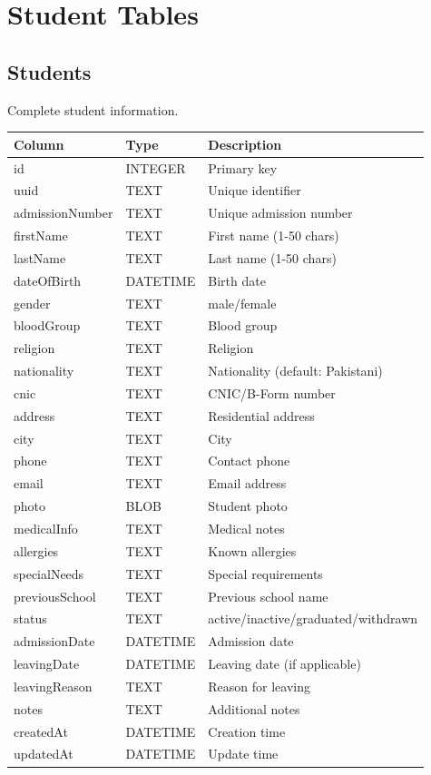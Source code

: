 \documentclass[12pt,a4paper]{report}
\begin{document}
\chapter{Student Tables}

\section{Students}

Complete student information.

\begin{longtable}{@{}p{4cm}p{2.5cm}p{6.5cm}@{}}
\toprule
\textbf{Column} & \textbf{Type} & \textbf{Description} \\
\midrule
\endhead
id & INTEGER & Primary key \\
uuid & TEXT & Unique identifier \\
admissionNumber & TEXT & Unique admission number \\
firstName & TEXT & First name (1-50 chars) \\
lastName & TEXT & Last name (1-50 chars) \\
dateOfBirth & DATETIME & Birth date \\
gender & TEXT & male/female \\
bloodGroup & TEXT & Blood group \\
religion & TEXT & Religion \\
nationality & TEXT & Nationality (default: Pakistani) \\
cnic & TEXT & CNIC/B-Form number \\
address & TEXT & Residential address \\
city & TEXT & City \\
phone & TEXT & Contact phone \\
email & TEXT & Email address \\
photo & BLOB & Student photo \\
medicalInfo & TEXT & Medical notes \\
allergies & TEXT & Known allergies \\
specialNeeds & TEXT & Special requirements \\
previousSchool & TEXT & Previous school name \\
status & TEXT & active/inactive/graduated/withdrawn \\
admissionDate & DATETIME & Admission date \\
leavingDate & DATETIME & Leaving date (if applicable) \\
leavingReason & TEXT & Reason for leaving \\
notes & TEXT & Additional notes \\
createdAt & DATETIME & Creation time \\
updatedAt & DATETIME & Update time \\
\bottomrule
\end{longtable}
\end{document}
